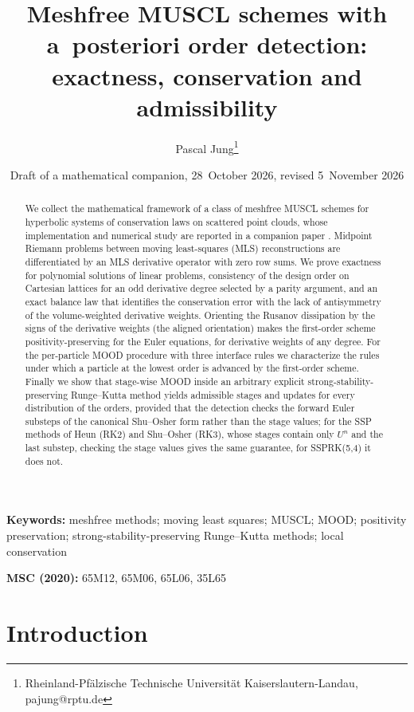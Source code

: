 \documentclass[11pt,a4paper]{article}
\title{Meshfree MUSCL schemes with a~posteriori order detection:\\
exactness, conservation and admissibility}
\author{Pascal Jung\thanks{Rheinland-Pfälzische Technische Universität Kaiserslautern-Landau, pajung@rptu.de}}
\date{Draft of a mathematical companion, 28~October 2026, revised 5~November 2026}
\theoremstyle{plain}
\theoremstyle{definition}
\theoremstyle{remark}
\numberwithin{equation}{section}
\begin{document}
\maketitle

\begin{abstract}
We collect the mathematical framework of a class of meshfree MUSCL schemes for hyperbolic systems of conservation laws on scattered point clouds, whose implementation and numerical study are reported in a companion paper \cite{JungMUSCL2026}. Midpoint Riemann problems between moving least-squares (MLS) reconstructions are differentiated by an MLS derivative operator with zero row sums. We prove exactness for polynomial solutions of linear problems, consistency of the design order on Cartesian lattices for an odd derivative degree selected by a parity argument, and an exact balance law that identifies the conservation error with the lack of antisymmetry of the volume-weighted derivative weights. Orienting the Rusanov dissipation by the signs of the derivative weights (the aligned orientation) makes the first-order scheme positivity-preserving for the Euler equations, for derivative weights of any degree. For the per-particle MOOD procedure with three interface rules we characterize the rules under which a particle at the lowest order is advanced by the first-order scheme. Finally we show that stage-wise MOOD inside an arbitrary explicit strong-stability-preserving Runge--Kutta method yields admissible stages and updates for every distribution of the orders, provided that the detection checks the forward Euler substeps of the canonical Shu--Osher form rather than the stage values; for the SSP methods of Heun (RK2) and Shu--Osher (RK3), whose stages contain only $U^n$ and the last substep, checking the stage values gives the same guarantee, for SSPRK(5,4) it does not.
\end{abstract}

\noindent\textbf{Keywords:} meshfree methods; moving least squares; MUSCL; MOOD; positivity preservation; strong-stability-preserving Runge--Kutta methods; local conservation

\noindent\textbf{MSC (2020):} 65M12, 65M06, 65L06, 35L65

\section{Introduction}\label{sec:intro}
\end{document}
